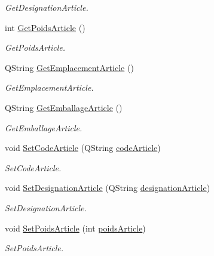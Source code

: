 \begin{DoxyCompactItemize}
\begin{DoxyCompactList}\small\item\em Get\+Designation\+Article. \end{DoxyCompactList}\item 
int \mbox{\hyperlink{class_article_a0509109984e6d86e783c457ce70d13a7}{Get\+Poids\+Article}} ()
\begin{DoxyCompactList}\small\item\em Get\+Poids\+Article. \end{DoxyCompactList}\item 
Q\+String \mbox{\hyperlink{class_article_aca48728ecc7862026b40b18db12591fa}{Get\+Emplacement\+Article}} ()
\begin{DoxyCompactList}\small\item\em Get\+Emplacement\+Article. \end{DoxyCompactList}\item 
Q\+String \mbox{\hyperlink{class_article_aa086c1a1aa8af81fb34c9a20b05d0155}{Get\+Emballage\+Article}} ()
\begin{DoxyCompactList}\small\item\em Get\+Emballage\+Article. \end{DoxyCompactList}\item 
void \mbox{\hyperlink{class_article_a5300f5a6247dd931cb411d7ff1721d7f}{Set\+Code\+Article}} (Q\+String \mbox{\hyperlink{class_article_a302186fb47a2b9bd8736bab99fe3ec75}{code\+Article}})
\begin{DoxyCompactList}\small\item\em Set\+Code\+Article. \end{DoxyCompactList}\item 
void \mbox{\hyperlink{class_article_a6ee68c7584a20323039ab5065c34eb81}{Set\+Designation\+Article}} (Q\+String \mbox{\hyperlink{class_article_a120a68e558a25bfd50bcc0ace22d6eef}{designation\+Article}})
\begin{DoxyCompactList}\small\item\em Set\+Designation\+Article. \end{DoxyCompactList}\item 
void \mbox{\hyperlink{class_article_af2412d92eb7d53ca7566755a900653c0}{Set\+Poids\+Article}} (int \mbox{\hyperlink{class_article_aaf339d5933ee1e8386dd57a8f84a9602}{poids\+Article}})
\begin{DoxyCompactList}\small\item\em Set\+Poids\+Article. \end{DoxyCompactList}\item 

\end{DoxyCompactItemize}
